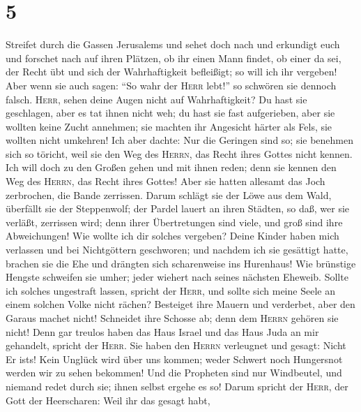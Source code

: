\hypertarget{section-4}{%
\section{5}\label{section-4}}

 Streifet durch die Gassen Jerusalems und sehet doch nach
und erkundigt euch und forschet nach auf ihren Plätzen, ob ihr einen
Mann findet, ob einer da sei, der Recht übt und sich der Wahrhaftigkeit
befleißigt; so will ich ihr vergeben! Aber wenn sie auch sagen:
 ``So wahr der \textsc{Herr} lebt!'' so schwören sie
dennoch falsch.  \textsc{Herr}, sehen deine Augen nicht
auf Wahrhaftigkeit? Du hast sie geschlagen, aber es tat ihnen nicht weh;
du hast sie fast aufgerieben, aber sie wollten keine Zucht annehmen; sie
machten ihr Angesicht härter als Fels, sie wollten nicht umkehren!
 Ich aber dachte: Nur die Geringen sind so; sie benehmen
sich so töricht, weil sie den Weg des \textsc{Herrn}, das Recht ihres
Gottes nicht kennen.  Ich will doch zu den Großen gehen
und mit ihnen reden; denn sie kennen den Weg des \textsc{Herrn}, das
Recht ihres Gottes! Aber sie hatten allesamt das Joch zerbrochen, die
Bande zerrissen.  Darum schlägt sie der Löwe aus dem Wald,
überfällt sie der Steppenwolf; der Pardel lauert an ihren Städten, so
daß, wer sie verläßt, zerrissen wird; denn ihrer Übertretungen sind
viele, und groß sind ihre Abweichungen!  Wie wollte ich
dir solches vergeben? Deine Kinder haben mich verlassen und bei
Nichtgöttern geschworen; und nachdem ich sie gesättigt hatte, brachen
sie die Ehe und drängten sich scharenweise ins Hurenhaus! 
Wie brünstige Hengste schweifen sie umher; jeder wiehert nach seines
nächsten Eheweib.  Sollte ich solches ungestraft lassen,
spricht der \textsc{Herr}, und sollte sich meine Seele an einem solchen
Volke nicht rächen?  Besteiget ihre Mauern und verderbet,
aber den Garaus machet nicht! Schneidet ihre Schosse ab; denn dem
\textsc{Herrn} gehören sie nicht!  Denn gar treulos haben
das Haus Israel und das Haus Juda an mir gehandelt, spricht der
\textsc{Herr}.  Sie haben den \textsc{Herrn} verleugnet
und gesagt: Nicht Er ist\textquotesingle s! Kein Unglück wird über uns
kommen; weder Schwert noch Hungersnot werden wir zu sehen bekommen!
 Und die Propheten sind nur Windbeutel, und niemand redet
durch sie; ihnen selbst ergehe es so!  Darum spricht der
\textsc{Herr}, der Gott der Heerscharen: Weil ihr das gesagt habt,
